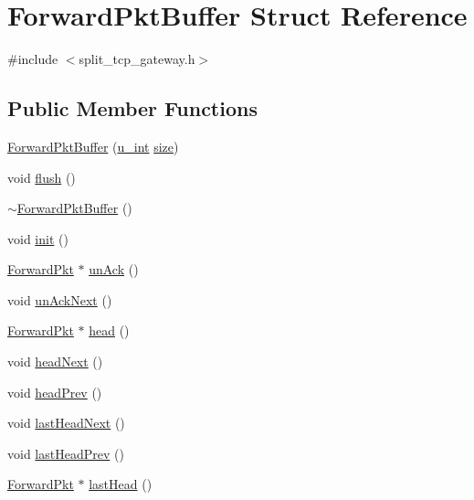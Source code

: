 \hypertarget{structForwardPktBuffer}{\section{\-Forward\-Pkt\-Buffer \-Struct \-Reference}
\label{structForwardPktBuffer}
}


{\ttfamily \#include $<$split\-\_\-tcp\-\_\-gateway.\-h$>$}

\subsection*{\-Public \-Member \-Functions}
\begin{DoxyCompactItemize}
\item 
\hyperlink{structForwardPktBuffer_ac9584cfd467108b002be94236c8629ef}{\-Forward\-Pkt\-Buffer} (\hyperlink{split__tcp__gateway_8h_ac319c165d52643e43249fe003e18bdf3}{u\-\_\-int} \hyperlink{structForwardPktBuffer_a6fb6ca6a471d0ee250200493f2448575}{size})
\item 
void \hyperlink{structForwardPktBuffer_aa300ecfe0f0db3647927dbf3a302ec1f}{flush} ()
\item 
\hyperlink{structForwardPktBuffer_a8a76f9bc514fe9ef44368329bff75b0b}{$\sim$\-Forward\-Pkt\-Buffer} ()
\item 
void \hyperlink{structForwardPktBuffer_ad8e1d43a1bfc6e49ca0912122bf2e19e}{init} ()
\item 
\hyperlink{structForwardPkt}{\-Forward\-Pkt} $\ast$ \hyperlink{structForwardPktBuffer_aad2e902ed1a92bc5b80bfc93776f5c16}{un\-Ack} ()
\item 
void \hyperlink{structForwardPktBuffer_a6f5ec5079172b6c7595c3c45f61de9c0}{un\-Ack\-Next} ()
\item 
\hyperlink{structForwardPkt}{\-Forward\-Pkt} $\ast$ \hyperlink{structForwardPktBuffer_a73b22adb70c22ae8cb705d14d9732ad5}{head} ()
\item 
void \hyperlink{structForwardPktBuffer_a26159c76aa5c397e2c66edef65f14930}{head\-Next} ()
\item 
void \hyperlink{structForwardPktBuffer_a76524c3b6e4ea282ef33c2bb3b8e4ec9}{head\-Prev} ()
\item 
void \hyperlink{structForwardPktBuffer_aeecf04727afb67f81039d7107e44772d}{last\-Head\-Next} ()
\item 
void \hyperlink{structForwardPktBuffer_ac001d467de52d16996b442fd2ccba0cb}{last\-Head\-Prev} ()
\item 
\hyperlink{structForwardPkt}{\-Forward\-Pkt} $\ast$ \hyperlink{structForwardPktBuffer_a4a90b0d9aa5e1676d24daaee6a507b02}{last\-Head} ()

\end{DoxyCompactItemize}
